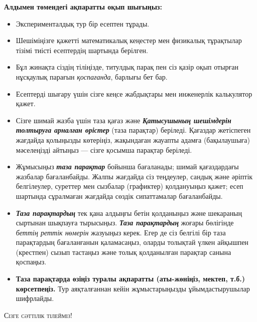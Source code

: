 \thispagestyle{empty}
\begin{center}
    \LARGE\textbf{\scshape{}}%
\end{center}
%
\vspace{2pt}%
%
\begin{center}
    \large{}
\end{center}
\vspace{2pt}
\begin{center}
\large\textbf{%
Алдымен төмендегі ақпаратты оқып шығыңыз:%
}
\end{center}
\vspace{4pt}
\begin{itemize}[leftmargin=*]
    \item Эксперименталдық тур бір есептен тұрады.
    \item Шешіміңізге қажетті математикалық кеңестер мен физикалық тұрақтылар тізімі тиісті есептердің шартында берілген.
    \item Бұл жинақта сіздің тіліңізде, титулдық парақ пен сіз қазір оқып отырған нұсқаулық парағын \textit{қоспағанда}, барлығы \pageref{LastPage} бет бар.
    \item Есептерді шығару үшін сізге кеңсе жабдықтары мен инженерлік калькулятор қажет.
    \item Сізге шимай жазба үшін таза қағаз және \textbf{\textit{Қатысушының шешімдерін толтыруға арналған өрістер}} (таза парақтар) беріледі. Қағаздар жетіспеген жағдайда қолыңызды көтеріңіз, жақындаған жауапты адамға (бақылаушыға) мәселеңізді айтыңыз --- сізге қосымша парақтар беріледі.
    \item Жұмысыңыз \textbf{\textit{таза парақтар}} бойынша бағаланады; шимай қағаздардағы жазбалар бағаланбайды. Жалпы жағдайда сіз теңдеулер, сандық және әріптік белгілеулер, суреттер мен сызбалар (графиктер) қолдануыңыз қажет; есеп шартында сұралмаған жағдайда сөздік сипаттамалар бағаланбайды.
    \item \textbf{\textit{Таза парақтардың}} тек қана алдыңғы бетін қолданыңыз және шекараның сыртынан шықпауға тырысыңыз. \textbf{\textit{Таза парақтардың}} жоғары бөлігінде \textit{беттің реттік нөмерін} жазуыңыз керек. Егер де сіз белгілі бір таза парақтардың бағаланғанын қаламасаңыз, оларды толықтай үлкен айқышпен (крестпен) сызып тастаңыз және толық қолданылған парақтар санына қоспаңыз.
    \item \textbf{Таза парақтарда өзіңіз туралы ақпаратты (аты-жөніңіз, мектеп, т.б.) көрсетпеңіз.} Тур аяқталғаннан кейін жұмыстарыңызды ұйымдастырушылар шифрлайды.
\end{itemize}
\vspace{4pt}
\begin{center}
    \textsc{Сізге сәттілік тілейміз!}
\end{center}
%
\begin{center}
    \textit{}
\end{center}

\newpage